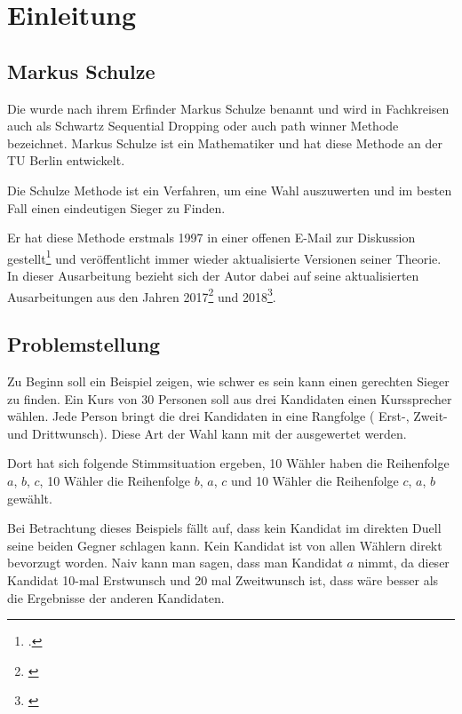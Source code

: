 \section{Einleitung}
\label{sec:Einleitung}


\subsection{Markus Schulze} 
\label{sec:markusSchulze}
Die \schulze wurde nach ihrem Erfinder Markus Schulze benannt und wird in Fachkreisen auch als \glqq Schwartz Sequential Dropping\grqq{} oder auch \glqq path winner\grqq{} Methode bezeichnet. Markus Schulze ist ein Mathematiker und hat diese Methode an der TU Berlin entwickelt.

Die Schulze Methode ist ein Verfahren, um eine Wahl auszuwerten und im besten Fall einen eindeutigen Sieger zu Finden.

Er hat diese Methode erstmals 1997 in einer offenen E-Mail zur Diskussion gestellt\footnote{\Vgl \citet{Schulze1997}.} und veröffentlicht immer wieder aktualisierte Versionen seiner Theorie. In dieser Ausarbeitung bezieht sich der Autor dabei auf seine aktualisierten Ausarbeitungen aus den Jahren 2017\footnote{\Vgl \citet{Schulze2017}} und 2018\footnote{\Vgl \citet{Schulze2018}}.

\subsection{Problemstellung} 
\label{sec:problemstellungBeispiel}
Zu Beginn soll ein Beispiel zeigen, wie schwer es sein kann einen gerechten Sieger zu finden. Ein Kurs von 30 Personen soll aus drei Kandidaten einen Kurssprecher wählen. Jede Person bringt die drei Kandidaten in eine Rangfolge ( Erst-, Zweit- und Drittwunsch). Diese Art der Wahl kann mit der \schulze ausgewertet werden. 

Dort hat sich folgende Stimmsituation ergeben, 10 Wähler  haben die Reihenfolge $a$, $b$, $c$, 10 Wähler die Reihenfolge $b$, $a$, $c$ und 10 Wähler die Reihenfolge $c$, $a$, $b$ gewählt.

Bei Betrachtung dieses Beispiels fällt auf, dass kein Kandidat im direkten Duell seine beiden Gegner schlagen kann. Kein Kandidat ist von allen Wählern direkt bevorzugt worden. Naiv kann man sagen, dass man Kandidat $a$ nimmt, da dieser Kandidat 10-mal Erstwunsch und 20 mal Zweitwunsch ist, dass wäre besser als die Ergebnisse der anderen Kandidaten. 

